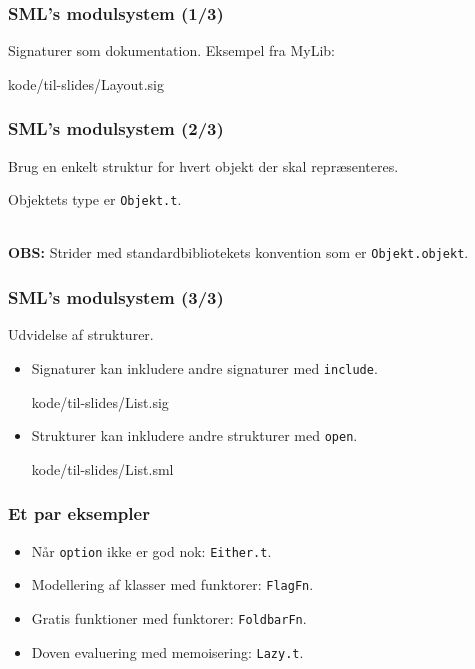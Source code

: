 \documentclass[slidestop,compress,mathserif, xcolor=table]{beamer}
\begin{document}
\begin{frame}
  \frametitle{SML's modulsystem \quad (1/3)}

  Signaturer som dokumentation. Eksempel fra MyLib:
  \begin{block}{}
    
    {kode/til-slides/Layout.sig}
  \end{block}
\end{frame}

\begin{frame}
  \frametitle{SML's modulsystem \quad (2/3)}
  Brug en enkelt struktur for hvert objekt der skal repræsenteres.

  \begin{block}{}
    \center Objektets type er \texttt{Objekt.t}.
  \end{block}\ \\

  \textbf{OBS:} Strider med standardbibliotekets konvention som er
  \texttt{Objekt.objekt}.
\end{frame}

\begin{frame}
  \frametitle{SML's modulsystem \quad (3/3)}
  Udvidelse af strukturer.
  \begin{itemize}
  \item Signaturer kan inkludere andre signaturer med \texttt{include}.
    \begin{block}{}
    
    {kode/til-slides/List.sig}
    \end{block}
  \item Strukturer kan inkludere andre strukturer med \texttt{open}.
    \begin{block}{}
    
    {kode/til-slides/List.sml}
    \end{block}
  \end{itemize}
\end{frame}

\begin{frame}
  \frametitle{Et par eksempler}
  \begin{itemize}
  \item Når \texttt{option} ikke er god nok: \texttt{Either.t}.
  \item Modellering af klasser med funktorer: \texttt{FlagFn}.
  \item Gratis funktioner med funktorer: \texttt{FoldbarFn}.
  \item Doven evaluering med memoisering: \texttt{Lazy.t}.
  \end{itemize}
\end{frame}
\end{document}
